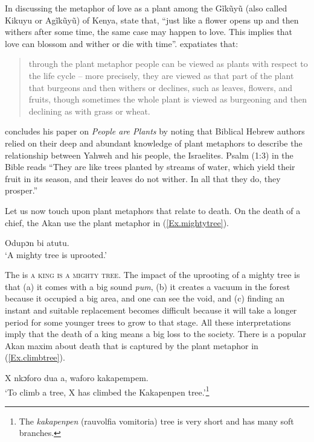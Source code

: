 \documentclass[output=paper,colorlinks,citecolor=brown]{langscibook}
\begin{document}
In discussing the metaphor of love as a plant among the Gĩkũyũ (also called Kikuyu or Agĩkũyũ) of Kenya, \citet[83]{GathigiaandMaitaria2019} state that, ``just like a flower opens up and then withers after some time, the same case may happen to love. This implies that love can blossom and wither or die with time''. \citet[577]{Basson2006} expatiates that:

\begin{quote}
    through the plant metaphor people can be viewed as plants with respect to the life cycle – more precisely, they are viewed as that part of the plant that burgeons and then withers or declines, such as leaves, flowers, and fruits, though sometimes the whole plant is viewed as burgeoning and then declining as with grass or wheat.
\end{quote}

\citet[581]{Basson2006} concludes his paper on \textit{People are Plants} by noting that Biblical Hebrew authors relied on their deep and abundant knowledge of plant metaphors to describe the relationship between Yahweh and his people, the Israelites. Psalm (1:3) in the Bible reads ``They are like trees planted by streams of water, which yield their fruit in its season, and their leaves do not wither. In all that they do, they prosper.''

Let us now touch upon plant metaphors that relate to death. On the death of a chief, the Akan use the plant metaphor in (\ref{Ex.mightytree}).

\ea \label{Ex.mightytree}
\gl Odupɔn bi 	atutu.\\
\glt  ‘A mighty tree is uprooted.’
\z

The  is \textsc{a king is a mighty tree}. The impact of the uprooting of a mighty tree is that (a) it comes with a big sound \textit{pum}, (b) it creates a vacuum in the forest because it occupied a big area, and one can see the void, and (c) finding an instant and suitable replacement becomes difficult because it will take a longer period for some younger trees to grow to that stage. All these interpretations imply that the death of a king means a big loss to the society. There is a popular Akan maxim about death that is captured by the plant metaphor in (\ref{Ex.climbtree}).

\ea \label{Ex.climbtree}
\gl X nkɔforo dua a, waforo kakapempem.\\
\glt  ‘To climb a tree, X has climbed the Kakapenpen tree.’\footnote{The \textit{kakapenpen} (rauvolfia vomitoria) tree is very short and has many soft branches.}
\z
\end{document}
